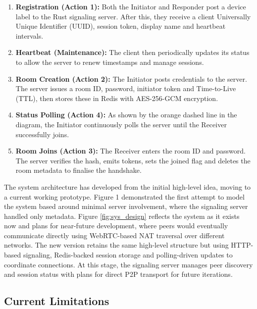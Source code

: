 \documentclass[12pt,a4paper]{article}
\begin{document}
\begin{enumerate}
    \item \textbf{Registration (Action 1):} Both the Initiator and Responder post a device label to the Rust signaling server. After this, they receive a client Universally Unique Identifier (UUID), session token, display name and heartbeat intervals.
    
    \item \textbf{Heartbeat (Maintenance):} The client then periodically updates its status to allow the server to renew timestamps and manage sessions.
    
    \item \textbf{Room Creation (Action 2):} The Initiator posts credentials to the server. The server issues a room ID, password, initiator token and Time-to-Live (TTL), then stores these in Redis with AES-256-GCM encryption.
    
    \item \textbf{Status Polling (Action 4):} As shown by the orange dashed line in the diagram, the Initiator continuously polls the server until the Receiver successfully joins.
    
    \item \textbf{Room Joins (Action 3):} The Receiver enters the room ID and password. The server verifies the hash, emits tokens, sets the joined flag and deletes the room metadata to finalise the handshake.
\end{enumerate}

The system architecture has developed from the initial high-level idea, moving to a current working prototype. Figure 1 demonstrated the first attempt to model the system based around minimal server involvement, where the signaling server handled only metadata. Figure \ref{fig:sys_design} reflects the system as it exists now and plans for near-future development, where peers would eventually communicate directly using WebRTC-based NAT traversal over different networks. The new version retains the same high-level structure but using HTTP-based signaling, Redis-backed session storage and polling-driven updates to coordinate connections. At this stage, the signaling server manages peer discovery and session status with plans for direct P2P transport for future iterations.


\subsection{Current Limitations}
\end{document}
